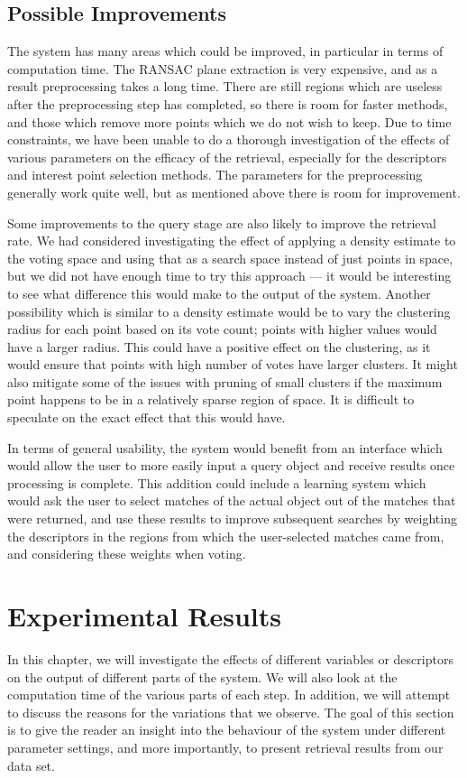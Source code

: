 \documentclass[11pt,a4paper]{kth-mag}
\begin{document}
\section{Possible Improvements}
The system has many areas which could be improved, in particular in terms of
computation time. The RANSAC plane extraction is very expensive, and as a result
preprocessing takes a long time. There are still regions which are useless after
the preprocessing step has completed, so there is room for faster methods, and
those which remove more points which we do not wish to keep. Due to time
constraints, we have been unable to do a thorough investigation of the effects
of various parameters on the efficacy of the retrieval, especially for the
descriptors and interest point selection methods. The parameters for the
preprocessing generally work quite well, but as mentioned above there is room
for improvement.

Some improvements to the query stage are also likely to improve the retrieval
rate. We had considered investigating the effect of applying a density estimate
to the voting space and using that as a search space instead of just points in
space, but we did not have enough time to try this approach --- it would be
interesting to see what difference this would make to the output of the system.
Another possibility which is similar to a density estimate would be to vary the
clustering radius for each point based on its vote count; points with higher
values would have a larger radius. This could have a positive effect on the
clustering, as it would ensure that points with high number of votes have larger
clusters. It might also mitigate some of the issues with pruning of small
clusters if the maximum point happens to be in a relatively sparse region of
space. It is difficult to speculate on the exact effect that this would have. 

In terms of general usability, the system would benefit from an interface which
would allow the user to more easily input a query object and receive results
once processing is complete. This addition could include a learning system which
would ask the user to select matches of the actual object out of the matches
that were returned, and use these results to improve subsequent searches by
weighting the descriptors in the regions from which the user-selected matches
came from, and considering these weights when voting.

\appendix
\chapter{Experimental Results}
\label{chap:exp}
In this chapter, we will investigate the effects of different variables or
descriptors on the output of different parts of the system. We will also look at
the computation time of the various parts of each step. In addition, we will
attempt to discuss the reasons for the variations that we observe. The goal of
this section is to give the reader an insight into the behaviour of the system
under different parameter settings, and more importantly, to present retrieval
results from our data set.
\end{document}
